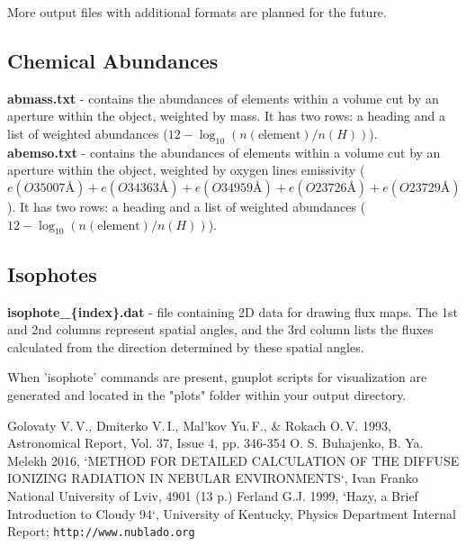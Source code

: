 \documentclass[a4paper]{article}
\begin{document}
More output files with additional formats are planned for the future.

\subsection{Chemical Abundances}
{\bf abmass.txt} - contains the abundances of elements within a volume cut by an aperture within the object, weighted by mass.
It has two rows: a heading and a list of weighted abundances ($12 - \log_{10}(n(\text{element})/n(H))$). \\

{\bf abemso.txt} - contains the abundances of elements within a volume cut by an aperture within the object, weighted by oxygen
lines emissivity ($e(O3 5007\text{\AA}) + e(O3 4363\text{\AA}) + e(O3 4959\text{\AA}) + e(O2 3726\text{\AA}) + e(O2 3729\text{\AA})$).
It has two rows: a heading and a list of weighted abundances ($12 - \log_{10}(n(\text{element})/n(H))$).

\subsection{Isophotes}

{\bf isophote\_\{index\}.dat} - file containing 2D data for drawing flux maps.
The 1st and 2nd columns represent spatial angles, and the 3rd column lists the fluxes calculated from the direction determined by these spatial angles.

When 'isophote' commands are present, gnuplot scripts for visualization are generated and located in the "plots"
folder within your output directory.


\begin{thebibliography}{3}
{\small
{} Golovaty V.\,V., Dmiterko V.\,I., Mal'kov Yu.\,F., \& Rokach O.\,V. 1993, Astronomical Report, Vol. 37, Issue 4, pp. 346-354
 O. S. Buhajenko, B. Ya. Melekh 2016, `METHOD FOR DETAILED CALCULATION OF THE DIFFUSE IONIZING RADIATION IN NEBULAR ENVIRONMENTS`, Ivan Franko National University of Lviv, 4901 (13 p.) 
 Ferland G.J. 1999, `Hazy, a Brief Introduction to Cloudy 94`, University of Kentucky, Physics Department Internal Report; \texttt{http://www.nublado.org}
}
\end{thebibliography}
\end{document}
